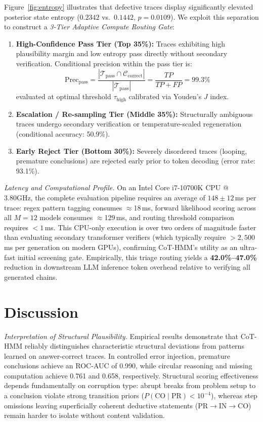 \documentclass[conference]{IEEEtran}
\begin{document}
Figure~\ref{fig:entropy} illustrates that defective traces display significantly elevated posterior state entropy ($0.2342$ vs.\ $0.1442$, $p=0.0109$). We exploit this separation to construct a \textit{3-Tier Adaptive Compute Routing Gate}:
\begin{enumerate}
    \setlength{\itemsep}{2pt}
    \item \textbf{High-Confidence Pass Tier (Top 35\%):} Traces exhibiting high plausibility margin and low entropy pass directly without secondary verification. Conditional precision within the pass tier is:
    \begin{equation}
    \text{Prec}_{\text{pass}} = \frac{|\mathcal{T}_{\text{pass}} \cap \mathcal{C}_{\text{correct}}|}{|\mathcal{T}_{\text{pass}}|} = \frac{TP}{TP + FP} = 99.3\%
    \label{eq:routing_acc}
    \end{equation}
    evaluated at optimal threshold $\tau_{\text{high}}$ calibrated via Youden's $J$ index.
    \item \textbf{Escalation / Re-sampling Tier (Middle 35\%):} Structurally ambiguous traces undergo secondary verification or temperature-scaled regeneration (conditional accuracy: 50.9\%).
    \item \textbf{Early Reject Tier (Bottom 30\%):} Severely disordered traces (looping, premature conclusions) are rejected early prior to token decoding (error rate: 93.1\%).
\end{enumerate}

\textit{Latency and Computational Profile.} On an Intel Core i7-10700K CPU @ 3.80GHz, the complete evaluation pipeline requires an average of $148 \pm 12$\,ms per trace: regex pattern tagging consumes $\approx$18\,ms, forward likelihood scoring across all $M=12$ models consumes $\approx$129\,ms, and routing threshold comparison requires $< 1$\,ms. This CPU-only execution is over two orders of magnitude faster than evaluating secondary transformer verifiers (which typically require $> 2{,}500$\,ms per generation on modern GPUs), confirming CoT-HMM's utility as an ultra-fast initial screening gate. Empirically, this triage routing yields a \textbf{42.0\%--47.0\%} reduction in downstream LLM inference token overhead relative to verifying all generated chains.

\section{Discussion}

\textit{Interpretation of Structural Plausibility.} Empirical results demonstrate that CoT-HMM reliably distinguishes characteristic structural deviations from patterns learned on answer-correct traces. In controlled error injection, premature conclusions achieve an ROC-AUC of 0.990, while circular reasoning and missing computation achieve 0.761 and 0.658, respectively. Structural scoring effectiveness depends fundamentally on corruption type: abrupt breaks from problem setup to a conclusion violate strong transition priors ($P(\text{CO}\mid\text{PR}) < 10^{-4}$), whereas step omissions leaving superficially coherent deductive statements ($\text{PR}\to\text{IN}\to\text{CO}$) remain harder to isolate without content validation.
\end{document}
